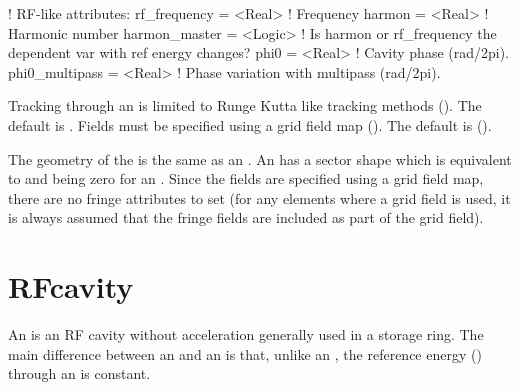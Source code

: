 {\begin{example}
  ! RF-like attributes:
  rf_frequency    = <Real>    ! Frequency
  harmon          = <Real>    ! Harmonic number
  harmon_master   = <Logic>   ! Is harmon or rf_frequency the dependent var with ref energy changes?
  phi0            = <Real>    ! Cavity phase (rad/2pi).
  phi0_multipass  = <Real>    ! Phase variation with multipass (rad/2pi).
\end{example}

Tracking through an  is limited to Runge Kutta like tracking methods (). The
default  is . Fields must be specified using a grid field map
(). The default  is  ().

The geometry of the  is the same as an . An  has a sector shape
which is equivalent to  and  being zero for an . Since the fields are specified
using a grid field map, there are no fringe attributes to set (for any elements where a grid field is
used, it is always assumed that the fringe fields are included as part of the grid field).

\newpage

\section{RFcavity}
\label{s:rfcav}

An  is an RF cavity without acceleration generally used in a storage ring. The main
difference between an  and an  is that, unlike an , the
reference energy () through an  is constant.

}
